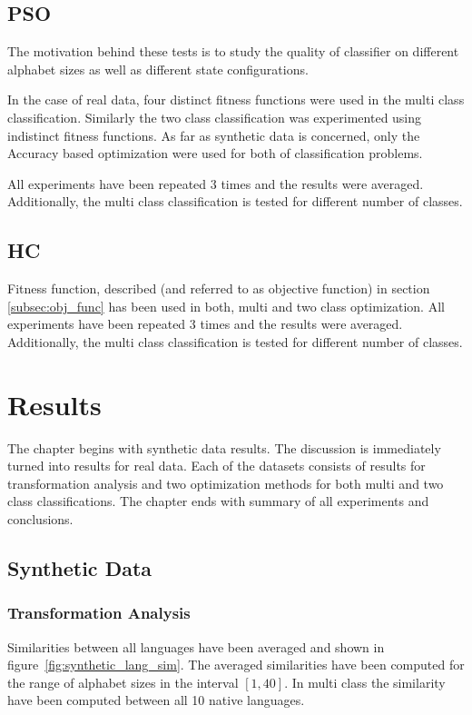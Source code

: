 \documentclass{mini}
\begin{document}
\section{PSO}
The motivation behind these tests is to study the quality of classifier on different alphabet sizes as well as different state configurations. 

In the case of real data, four distinct fitness functions were used in the multi class classification. Similarly the two class classification was experimented using indistinct fitness functions. As far as synthetic data is concerned, only the Accuracy based optimization were used for both of classification problems.

All experiments have been repeated $3$ times and the results were averaged. Additionally, the multi class classification is tested for different number of classes. 
\section{HC}
Fitness function, described (and referred to as objective function) in section \ref{subsec:obj_func} has been used in both, multi and two class optimization. All experiments have been repeated $3$ times and the results were averaged. Additionally, the multi class classification is tested for different number of classes.


\chapter{Results}\label{chap:results}

The chapter begins with synthetic data results. The discussion is immediately turned into results for real data. Each of the datasets consists of results for transformation analysis and two optimization methods for both multi and two class classifications. The chapter ends with summary of all experiments and conclusions.

\section{Synthetic Data}

\subsection{Transformation Analysis}

Similarities between all languages have been averaged and shown in figure~\ref{fig:synthetic_lang_sim}. The averaged similarities have been computed for the range of alphabet sizes in the interval $[1, 40]$. In multi class the similarity have been computed between all 10 native languages. 
\end{document}
